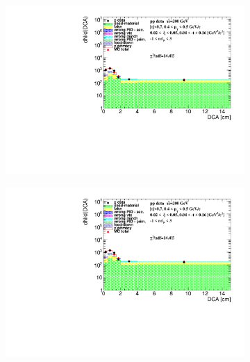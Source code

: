 \begin{figure}[h!]
\begin{subfigure}{.45\textwidth}
	\end{subfigure}
	\begin{subfigure}{.45\textwidth}
		\includegraphics[width=\linewidth, page=8]{chapters/chrgSTAR/img/DCAproton/background_p_0.pdf}
	\end{subfigure}
	\begin{subfigure}{.45\textwidth}
		\includegraphics[width=\linewidth, page=11]{chapters/chrgSTAR/img/DCAproton/background_p_0.pdf}
	\end{subfigure}
	\begin{subfigure}{.45\textwidth}

\end{subfigure}
\end{figure}
